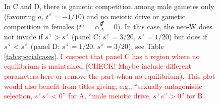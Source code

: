 \documentclass[12pt]{article}
\begin{document}
\begin{figure}[!h]
{In C and D, there is gametic competition among male gametes only (favouring $a$, $t^\male=-1/10$) and no meiotic drive or gametic competition in females ($t^\female=\alpha^\Hermaphrodite_{\Delta}=0$). 
In this case, the neo-W does not invade if $s^\female>s^\male$ (panel C: $s^\female=3/20$, $s^\male=1/20$) but does if $s^\female<s^\male$ (panel D: $s^\female=1/20$, $s^\male=3/20$), see Table \ref{tab:specialcases}.
\textcolor{red}{
I suspect that panel C has a region where no equilibrium is maintained (CHECK! Maybe include different parameters here or remove the part when no equilibrium). 
This plot would also benefit from titles giving, e.g., ``sexually-antagonistic selection, $s^\female s^\male<0$'' for A, ``male meiotic drive, $s^\female s^\male>0$'' for B}
}
\label{fig:Combination_Centimorgans}
\end{figure}
\newpage



\end{document}
